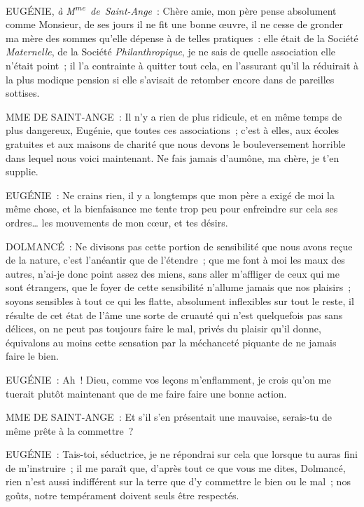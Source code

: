 \documentclass[french,twoside]{book} %
\begin{document}
EUGÉNIE, {\itshape à M\textsuperscript{me} de Saint-Ange} : Chère amie, mon père pense absolument comme Monsieur, de ses jours il ne fit une bonne œuvre, il ne cesse de gronder ma mère des sommes qu’elle dépense à de telles pratiques : elle était de la Société {\itshape Maternelle}, de la Société {\itshape Philanthropique}, je ne sais de quelle association elle n’était point ; il l’a contrainte à quitter tout cela, en l’assurant qu’il la réduirait à la plus modique pension si elle s’avisait de retomber encore dans de pareilles sottises.\par
MME DE SAINT-ANGE : Il n’y a rien de plus ridicule, et en même temps de plus dangereux, Eugénie, que toutes ces associations ; c’est à elles, aux écoles gratuites et aux maisons de charité que nous devons le bouleversement horrible dans lequel nous voici maintenant. Ne fais jamais d’aumône, ma chère, je t’en supplie.\par
EUGÉNIE : Ne crains rien, il y a longtemps que mon père a exigé de moi la même chose, et la bienfaisance me tente trop peu pour enfreindre sur cela ses ordres… les mouvements de mon cœur, et tes désirs.\par
DOLMANCÉ : Ne divisons pas cette portion de sensibilité que nous avons reçue de la nature, c’est l’anéantir que de l’étendre ; que me font à moi les maux des autres, n’ai-je donc point assez des miens, sans aller m’affliger de ceux qui me sont étrangers, que le foyer de cette sensibilité n’allume jamais que nos plaisirs ; soyons sensibles à tout ce qui les flatte, absolument inflexibles sur tout le reste, il résulte de cet état de l’âme une sorte de cruauté qui n’est quelquefois pas sans délices, on ne peut pas toujours faire le mal, privés du plaisir qu’il donne, équivalons au moins cette sensation par la méchanceté piquante de ne jamais faire le bien.\par
EUGÉNIE : Ah ! Dieu, comme vos leçons m’enflamment, je crois qu’on me tuerait plutôt maintenant que de me faire faire une bonne action.\par
MME DE SAINT-ANGE : Et s’il s’en présentait une mauvaise, serais-tu de même prête à la commettre ?\par
EUGÉNIE : Tais-toi, séductrice, je ne répondrai sur cela que lorsque tu auras fini de m’instruire ; il me paraît que, d’après tout ce que vous me dites, Dolmancé, rien n’est aussi indifférent sur la terre que d’y commettre le bien ou le mal ; nos goûts, notre tempérament doivent seuls être respectés.\par
\end{document}
